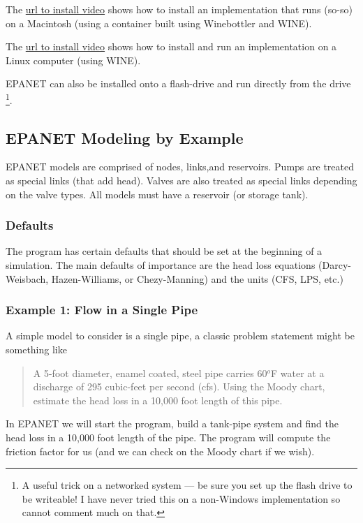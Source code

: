The \url{url to install video} shows how to install an implementation that runs (so-so) on a Macintosh (using a container built using Winebottler and WINE).

The \url{url to install video} shows how to install and run an implementation on a Linux computer (using WINE).

EPANET can also be installed onto a flash-drive and run directly from the drive \footnote{A useful trick on a networked system --- be sure you set up the flash drive to be writeable!  I have never tried this on a non-Windows implementation so cannot comment much on that.}.

\subsection{EPANET Modeling by Example}
EPANET models are comprised of nodes, links,and reservoirs.    Pumps are treated as special links (that add head).  Valves are also treated as special links depending on the valve types.  All models must have a reservoir (or storage tank).

\subsubsection{Defaults}
The program has certain defaults that should be set at the beginning of a simulation.  The main defaults of importance are the head loss equations (Darcy-Weisbach, Hazen-Williams, or Chezy-Manning) and the units (CFS, LPS, etc.)   

\subsubsection{Example 1: Flow in a Single Pipe}
A simple model to consider is a single pipe, a classic problem statement might be something like

\begin{quote}A 5-foot diameter, enamel coated, steel pipe carries 60$^o$F water at a discharge of 295 cubic-feet per second (cfs).  Using the Moody chart, estimate the head loss in a 10,000 foot length of this pipe.
\end{quote}

In EPANET we will start the program, build a tank-pipe system and find the head loss in a 10,000 foot length of the pipe.  The program will compute the friction factor for us (and we can check on the Moody chart if we wish).  


